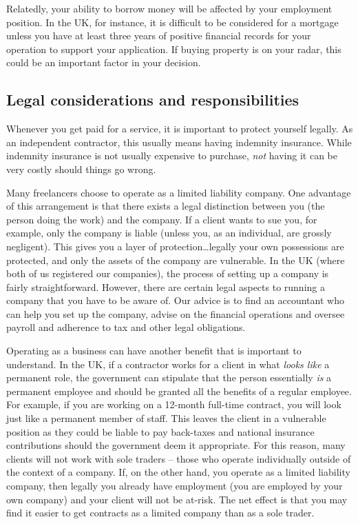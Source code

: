 \documentclass[
]{book}
\begin{document}
Relatedly, your ability to borrow money will be affected by your employment position. In the UK, for instance, it is difficult to be considered for a mortgage unless you have at least three years of positive financial records for your operation to support your application. If buying property is on your radar, this could be an important factor in your decision.

\hypertarget{legal-considerations-and-responsibilities}{%
\subsection{Legal considerations and responsibilities}\label{legal-considerations-and-responsibilities}}

Whenever you get paid for a service, it is important to protect yourself legally. As an independent contractor, this usually means having indemnity insurance. While indemnity insurance is not usually expensive to purchase, \emph{not} having it can be very costly should things go wrong.

Many freelancers choose to operate as a limited liability company. One advantage of this arrangement is that there exists a legal distinction between you (the person doing the work) and the company. If a client wants to sue you, for example, only the company is liable (unless you, as an individual, are grossly negligent). This gives you a layer of protection\ldots legally your own possessions are protected, and only the assets of the company are vulnerable. In the UK (where both of us registered our companies), the process of setting up a company is fairly straightforward. However, there are certain legal aspects to running a company that you have to be aware of. Our advice is to find an accountant who can help you set up the company, advise on the financial operations and oversee payroll and adherence to tax and other legal obligations.

Operating as a business can have another benefit that is important to understand. In the UK, if a contractor works for a client in what \emph{looks like} a permanent role, the government can stipulate that the person essentially \emph{is} a permanent employee and should be granted all the benefits of a regular employee. For example, if you are working on a 12-month full-time contract, you will look just like a permanent member of staff. This leaves the client in a vulnerable position as they could be liable to pay back-taxes and national insurance contributions should the government deem it appropriate. For this reason, many clients will not work with sole traders -- those who operate individually outside of the context of a company. If, on the other hand, you operate as a limited liability company, then legally you already have employment (you are employed by your own company) and your client will not be at-risk. The net effect is that you may find it easier to get contracts as a limited company than as a sole trader.
\end{document}
